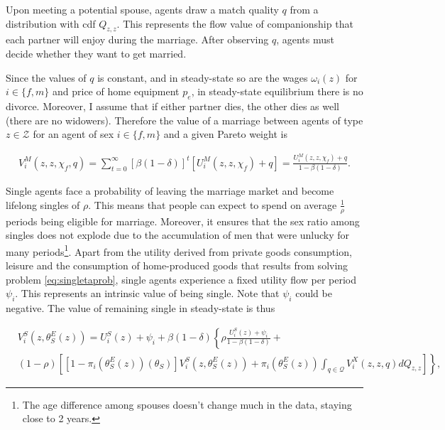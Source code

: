 \documentclass[12pt]{article}
\begin{document}
Upon meeting a potential spouse, agents draw a match quality $q$ from a distribution with cdf $Q_{z,z}$. This represents the flow value of companionship that each partner will enjoy during the marriage. After observing $q$, agents must decide whether they want to get married. 

Since the values of $q$ is constant, and in steady-state so are the wages $\omega_i(z)$ for $i\in\{f,m\}$ and price of home equipment $p_e$, in steady-state equilibrium there is no divorce. Moreover, I assume that if either partner dies, the other dies as well (there are no widowers). Therefore the value of a marriage between agents of type $z\in \mathcal{Z}$ for an agent of sex $i\in\{f,m\}$ and a given Pareto weight is

\begin{align}
	V_i^M\left(z,z,\chi_f,q\right)=\sum_{t=0}^{\infty}\left[\beta\left(1-\delta\right)\right]^t\left[U_i^M(z,z,\chi_f)+q\right]=  \frac{U_i^M(z,z,\chi_f)+q}{1-\beta\left(1-\delta\right)}. \label{eq:val_married}
\end{align}

Single agents face a probability of leaving the marriage market and become lifelong singles of $\rho$. This means that people can expect to spend on average $\frac{1}{\rho}$ periods being eligible for marriage. Moreover, it ensures that the sex ratio among singles does not explode due to the accumulation of men that were unlucky for many periods\footnote{The age difference among spouses doesn't change much in the data, staying close to 2 years.}. Apart from the utility derived from private goods consumption, leisure and the consumption of home-produced goods that results from solving problem \ref{eq:singletaprob}, single agents experience a fixed utility flow per period $\psi_i$. This represents an intrinsic value of being single. Note that $\psi_i$ could be negative. The value of remaining single in steady-state is thus

\begin{align*}
&V_i^S\left(z,\theta_{S}^E(z)\right) = U_i^S\left(z\right)+\psi_i+\beta\left(1-\delta\right)\left\lbrace \rho \frac{U_i^S\left(z\right)+\psi_i}{1-\beta\left(1-\delta\right)}+\right.\\ &\left.\left(1-\rho\right)\left[\left[1-\pi_{i}(\theta_{S}^E(z))\left(\theta_S\right)\right]V_i^S\left(z,\theta_{S}^E(z)\right)+\pi_{i}\left(\theta_{S}^E(z)\right)\int_{q\in\mathcal{Q}}V_i^X\left(z,z,q\right)dQ_{z,z}\right]\right\rbrace,
\end{align*}
\end{document}
